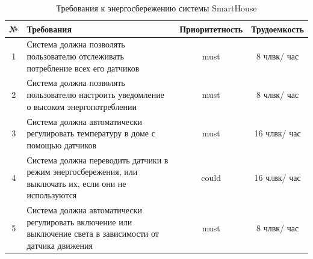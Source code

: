 \documentclass{article}
\begin{document}
\begin{table}[H]
    \centering
    \begin{tabular}{|c|p{7cm}|c|c|}
    \hline
        № & Требования & Приоритетность & Трудоемкость \\ \hline
        1 & Система должна позволять пользователю отслеживать потребление всех его датчиков & must & 8 члвк/ час \\ \hline
        2 & Система должна позволять пользователю настроить уведомление о высоком энергопотреблении & must & 8 члвк/ час \\ \hline
        3 & Система должна автоматически регулировать температуру в доме с помощью датчиков & must & 16 члвк/ час \\ \hline
        4 & Система должна переводить датчики в режим энергосбережения, или выключать их, если они не используются & could & 16 члвк/ час \\ \hline
        5 & Система должна автоматически регулировать включение или выключение света в зависимости от датчика движения & must & 8 члвк/ час\\ \hline
    \end{tabular}
        \caption{Требования к энергосбережению системы SmartHouse}
\end{table}
\end{document}
